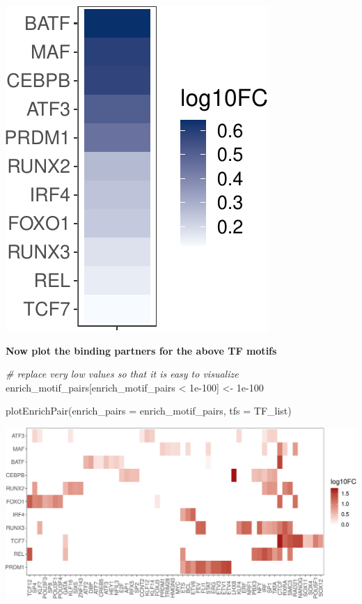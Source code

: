 \documentclass[
]{article}
\newenvironment{Shaded}{}{}
\newcommand{\AttributeTok}[1]{\textcolor[rgb]{0.49,0.56,0.16}{#1}}
\newcommand{\CommentTok}[1]{\textcolor[rgb]{0.38,0.63,0.69}{\textit{#1}}}
\newcommand{\FloatTok}[1]{\textcolor[rgb]{0.25,0.63,0.44}{#1}}
\newcommand{\FunctionTok}[1]{\textcolor[rgb]{0.02,0.16,0.49}{#1}}
\newcommand{\NormalTok}[1]{#1}
\newcommand{\OtherTok}[1]{\textcolor[rgb]{0.00,0.44,0.13}{#1}}
\newcommand{\SpecialCharTok}[1]{\textcolor[rgb]{0.25,0.44,0.63}{#1}}
\begin{document}
\includegraphics{enrichmotifpairR_user_manual_guide_files/figure-latex/CD8_H3K27ac_vs_H3K27me3_4-1.pdf}

\textbf{Now plot the binding partners for the above TF motifs}

\begin{Shaded}
\begin{Highlighting}[]
\CommentTok{\# replace very low values so that it is easy to visualize}
\NormalTok{enrich\_motif\_pairs[enrich\_motif\_pairs }\SpecialCharTok{\textless{}} \FloatTok{1e{-}100}\NormalTok{] }\OtherTok{\textless{}{-}} \FloatTok{1e{-}100}

\FunctionTok{plotEnrichPair}\NormalTok{(}\AttributeTok{enrich\_pairs =}\NormalTok{ enrich\_motif\_pairs,}
               \AttributeTok{tfs =}\NormalTok{ TF\_list)}
\end{Highlighting}
\end{Shaded}

\includegraphics{enrichmotifpairR_user_manual_guide_files/figure-latex/CD8_H3K27ac_vs_H3K27me3_5-1.pdf}
\end{document}

